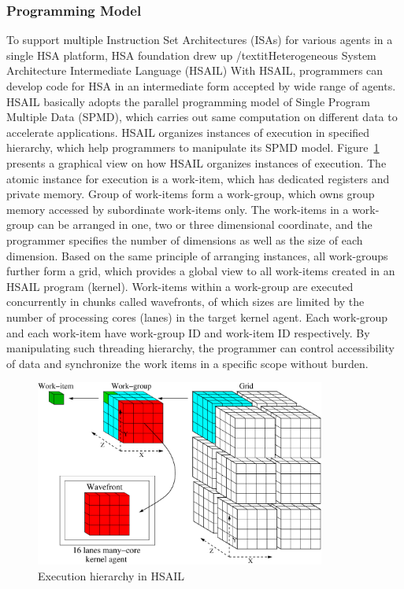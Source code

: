         \subsubsection{Programming Model}
        To support multiple Instruction Set Architectures (ISAs) for various agents in a single HSA platform,
        HSA foundation drew up /textit{Heterogeneous System Architecture Intermediate Language} (HSAIL)
        With HSAIL, programmers can develop code for HSA in an intermediate form accepted by wide range of agents.
        HSAIL basically adopts the parallel programming model of Single Program Multiple Data (SPMD), 
        which carries out same computation on different data to accelerate applications.
        HSAIL organizes instances of execution in specified hierarchy, which help programmers to manipulate its SPMD model.
        Figure~\ref{fig:grid} presents a graphical view on how HSAIL organizes instances of execution.
        The atomic instance for execution is a work-item, which has dedicated registers and private memory.
        Group of work-items form a work-group, which owns group memory accessed by subordinate work-items only.
        The work-items in a work-group can be arranged in one, two or three dimensional coordinate, 
        and the programmer specifies the number of dimensions as well as the size of each dimension.
        Based on the same principle of arranging instances, all work-groups further form a grid, 
        which provides a global view to all work-items created in an HSAIL program (kernel).
        Work-items within a work-group are executed concurrently in chunks called wavefronts, 
        of which sizes are limited by the number of processing cores (lanes) in the target kernel agent.
        Each work-group and each work-item have work-group ID and work-item ID respectively.
        By manipulating such threading hierarchy, 
        the programmer can control accessibility of data and synchronize the work items in a specific scope without burden.
        \vspace{\textfig}
        \begin{figure}[!ht] 
            \centering
            \includegraphics[width=0.85\textwidth]{./figs/grid.eps}
            \caption{Execution hierarchy in HSAIL}
            \label{fig:grid}
        \end{figure}
